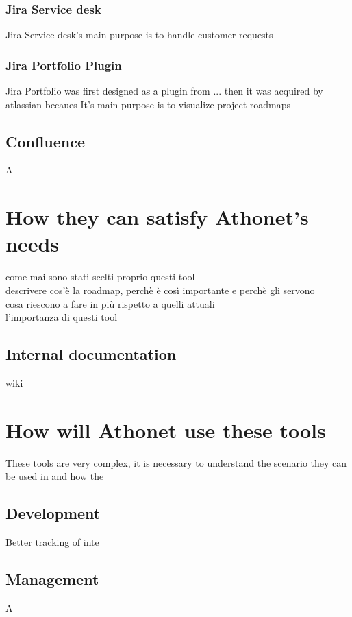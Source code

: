 		\subsubsection{Jira Service desk}
			Jira Service desk's main purpose is to handle customer requests

		\subsubsection{Jira Portfolio Plugin}
			Jira Portfolio was first designed as a plugin from ... then it was acquired by atlassian becaues
			It's main purpose is to visualize project roadmaps
		
	\subsection{Confluence}
		A

\section{How they can satisfy Athonet's needs}
come mai sono stati scelti proprio questi tool\\
descrivere cos'è la roadmap, perchè è così importante e perchè gli servono\\
cosa riescono a fare in più rispetto a quelli attuali\\
l'importanza di questi tool
		
	\subsection{Internal documentation}
		wiki

\section{How will Athonet use these tools}

	These tools are very complex, it is necessary to understand the scenario they can be used in and how the

	\subsection{Development} 
		Better tracking of inte
	
	\subsection{Management} 
		A
	
